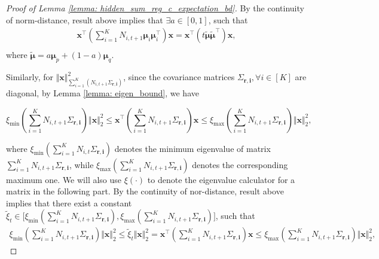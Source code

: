 \begin{proof}[Proof of Lemma \ref{lemma: hidden_sum_reg_c_expectation_bd}]
By the continuity of norm-distance, result above implies that $\exists a \in [0,1]$, such that
\begin{equation}
\begin{aligned}
\label{eq: eq_mu}
\boldsymbol{x}^{\top} \left( \sum_{i=1}^{K} N_{i,t+1} \boldsymbol{\mu}_{i} \boldsymbol{\mu}_{i}^{\top}
\right) \boldsymbol{x}
=
\boldsymbol{x}^{\top} \left( t \boldsymbol{\tilde{\mu}} \boldsymbol{\tilde{\mu}}^{\top}
\right) \boldsymbol{x}, \\
\end{aligned}
\end{equation}
where $\boldsymbol{\tilde{\mu}} = a \boldsymbol{\mu}_{p} + (1-a) \boldsymbol{\mu}_{q}$.

Similarly, for $\Vert\boldsymbol{x} \Vert^2_{ \sum_{i=1}^{K} \left( N_{i,t+1} \Sigma_{\boldsymbol{r,i}} \right) }$, since the covariance matrices $\Sigma_{\boldsymbol{r,i}}, \forall i \in [K]$ are diagonal, by Lemma \ref{lemma: eigen_bound}, we have 
\begin{small}
\[
\xi_{\min} \left( \sum_{i=1}^{K} N_{i,t+1} \Sigma_{\boldsymbol{r,i}} \right)
\Vert \boldsymbol{x} \Vert_2^2
\leq
\boldsymbol{x}^{\top}
\left( \sum_{i=1}^{K} N_{i,t+1} \Sigma_{\boldsymbol{r,i}} \right)
\boldsymbol{x}
\leq
\xi_{\max} \left( \sum_{i=1}^{K} N_{i,t+1} \Sigma_{\boldsymbol{r,i}} \right)
\Vert \boldsymbol{x} \Vert_2^2,
\]
\end{small}

where 
$\xi_{\min} ( \sum_{i=1}^{K} N_{i,t} \Sigma_{\boldsymbol{r,i}})$
denotes the minimum eigenvalue of matrix 
$\sum_{i=1}^{K} N_{i,t+1} \Sigma_{\boldsymbol{r,i}} $, while 
$\xi_{\max} ( \sum_{i=1}^{K} N_{i,t+1} \Sigma_{\boldsymbol{r,i}} )$
denotes the corresponding maximum one.
We will also use $\xi (\cdot)$ to denote the eigenvalue calculator for a matrix in the following part.
By the continuity of nor-distance, result above implies that there exist a constant 
$\tilde{\xi}_t \in \big[\xi_{\min} ( \sum_{i=1}^{K} N_{i,t+1} \Sigma_{\boldsymbol{r,i}} ), \xi_{\max} ( \sum_{i=1}^{K} N_{i,t+1} \Sigma_{\boldsymbol{r,i}} ) \big]$, such that
\[
\begin{aligned}
\xi_{\min} \left( \sum_{i=1}^{K} N_{i,t+1} \Sigma_{\boldsymbol{r,i}} \right) 
\Vert\boldsymbol{x} \Vert_2^2 
\leq
\tilde{\xi}_t \Vert \boldsymbol{x} \Vert_2^2
=
\boldsymbol{x} ^{\top}
\left( \sum_{i=1}^{K} N_{i,t+1} \Sigma_{\boldsymbol{r,i}} \right)
\boldsymbol{x}
\leq
\xi_{\max} \left( \sum_{i=1}^{K} N_{i,t+1} \Sigma_{\boldsymbol{r,i}} \right)
\Vert \boldsymbol{x} \Vert_2^2,
\end{aligned}
\]


\end{proof}
